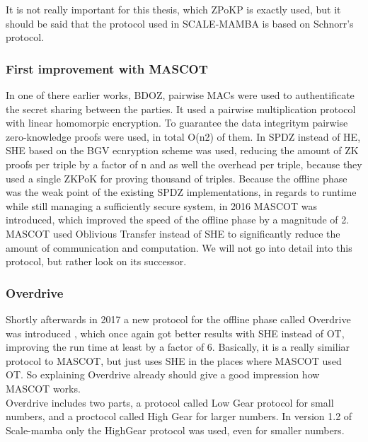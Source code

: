 \documentclass[english,runningheads,a4paper]{llncs}[2018/03/10]
\begin{document}
It is not really important for this thesis, which ZPoKP is exactly used, but it should be said that the protocol used in SCALE-MAMBA is based on Schnorr's protocol.\\

\subsubsection{First improvement with MASCOT}
In one of there earlier works, BDOZ, pairwise MACs were used to authentificate the secret sharing between the parties. It used a pairwise multiplication protocol with linear homomorpic encryption. To guarantee the data integritym pairwise zero-knowledge proofs were used, in total O(n2) of them. 
In SPDZ instead of HE, SHE based on the BGV ecnryption scheme was used, reducing the amount of ZK proofs per triple by a factor of n and as well the overhead per triple, because they used a single ZKPoK for proving thousand of triples.
Because the offline phase was the weak point of the existing SPDZ implementations, in regards to runtime while still managing a sufficiently secure system, in 2016 MASCOT \cite{cryptoeprint:2016:505} was introduced, which improved the speed of the offline phase by a magnitude of 2. MASCOT used Oblivious Transfer instead of SHE to significantly reduce the amount of communication and computation. We will not go into detail into this protocol, but rather look on its successor.


\subsubsection{Overdrive}
Shortly afterwards in 2017 a new protocol for the offline phase called Overdrive was introduced \cite{cryptoeprint:2017:1230}, which once again got better results with SHE instead of OT, improving the run time at least by a factor of 6. Basically, it is a really similiar protocol to MASCOT, but just uses SHE in the places where MASCOT used OT. So explaining Overdrive already should give a good impression how MASCOT works. \\
 Overdrive includes two parts, a protocol called Low Gear protocol for small numbers, and a proctocol called High Gear for larger numbers. In version 1.2 of Scale-mamba only the HighGear protocol was used, even for smaller numbers.\\
\end{document}
